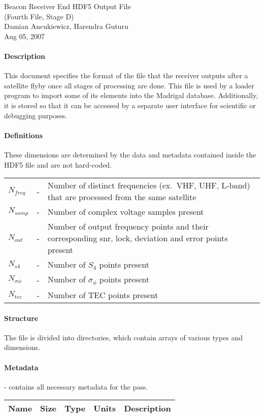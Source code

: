 \documentclass[12pt]{article}
\begin{document}
\begin{center}
\Large{Beacon Receiver End HDF5 Output File}\\
\large{(Fourth File, Stage D)}\\
\large{Damian Ancukiewicz, Harendra Guturu}\\
\large{Aug 05, 2007}
\end{center}

\begin{small}
\paragraph{Description}
This document specifies the format of the file that the receiver outputs after a satellite flyby once all stages of processing are done. This file is used by a loader program to import some of its elements into the Madrigal database. Additionally, it is stored so that it can be accessed by a separate user interface for scientific or debugging purposes.
\paragraph{Definitions}
These dimensions are determined by the data and metadata contained inside the HDF5 file and are not hard-coded.\\

\begin{tabular}{l c p{10cm}}
$N_{freq}$ &-& Number of distinct frequencies (ex.~VHF, UHF, L-band) that are processed from the same satellite \\
$N_{samp}$ &-& Number of complex voltage samples present\\
$N_{out}$ &-& Number of output frequency points and their corresponding snr, lock, deviation and error points present\\
$N_{s4}$ &-& Number of $S_4$ points present\\
$N_{\sigma \phi}$ &-& Number of $\sigma _\phi$ points present\\
$N_{tec}$ &-& Number of TEC points present\\
\end{tabular}

\paragraph{Structure}
The file is divided into directories, which contain arrays of various types and dimensions. 

\paragraph{Metadata}- contains all necessary metadata for the pass.\\
\begin{scriptsize}
\begin{tabular}{|l|l|l|c|p{7cm}|}
\hline
\textbf{Name} & \textbf{Size} & \textbf{Type} & \textbf{Units} & \textbf{Description} \\
\hline


\end{tabular}
\end{scriptsize}
\end{small}
\end{document}
